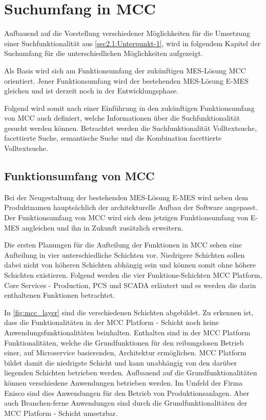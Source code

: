 \chapter{Suchumfang in MCC\label{chap3:Drittes-Kapitel}}

Aufbauend auf die Vorstellung verschiedener Möglichkeiten für die Umsetzung einer Suchfunktionalität aus \autoref{sec2.1:Unterpunkt-1}, wird in folgendem Kapitel der Suchumfang für die unterschiedlichen Möglichkeiten aufgezeigt.

Als Basis wird sich am Funktionsumfang der zukünftigen MES-Lösung \glqq MCC\grqq{} orientiert. Jener Funktionsumfang wird der bestehenden MES-Lösung \glqq E-MES\grqq{} gleichen und ist derzeit noch in der Entwicklungsphase.

Folgend wird somit nach einer Einführung in den zukünftigen Funktionsumfang von \glqq MCC\grqq{} auch definiert, welche Informationen über die Suchfunktionalität gesucht werden können. Betrachtet werden die Suchfunktionalität \glqq Volltextsuche\grqq{}, \glqq facettierte Suche\grqq{}, \glqq semantische Suche\grqq{} und die Kombination \glqq facettierte Volltextsuche\grqq{}.

\section{Funktionsumfang von MCC\label{sec3.1:Unterunterpunkt-1}}

Bei der Neugestaltung der bestehenden MES-Lösung \glqq E-MES\grqq{} wird neben dem Produktnamen hauptsächlich der architekturelle Aufbau der Software angepasst. Der Funktionsumfang von \glqq MCC\grqq{} wird sich dem jetzigen Funktionsumfang von \glqq E-MES\grqq{} angleichen und ihn in Zukunft zusätzlich erweitern.

Die ersten Planungen für die Aufteilung der Funktionen in \glqq MCC\grqq{} sehen eine Aufteilung in vier unterschiedliche Schichten vor. Niedrigere Schichten sollen dabei nicht von höheren Schichten abhängig sein und können somit ohne höhere Schichten existieren. Folgend werden die vier Funktions-Schichten \glqq MCC Platform\grqq{}, \glqq Core Services - Production\grqq{}, \glqq PCS\grqq{} und \glqq SCADA\grqq{} erläutert und es werden die darin enthaltenen Funktionen betrachtet.

In \autoref{fig:mcc_layer} sind die verschiedenen Schichten abgebildet. Zu erkennen ist, dass die Funktionalitäten in der \glqq MCC Platform\grqq{} - Schicht noch keine Anwendungsfunktionalitäten beinhalten. Enthalten sind in der \glqq MCC Platform\grqq{} Funktionalitäten, welche die Grundfunktionen für den reibungslosen Betrieb einer, auf Microservice basierenden, Architektur ermöglichen. \glqq MCC Platform\grqq{} bildet damit die niedrigste Schicht und kann unabhängig von den darüber liegenden Schichten betrieben werden. Aufbauend auf die Grundfunktionalitäten können verschiedene Anwendungen betrieben werden. Im Umfeld der Firma Enisco sind dies Anwendungen für den Betrieb von Produktionsanlagen. Aber auch Branchen-ferne Anwendungen sind durch die Grundfunktionalitäten der \glqq MCC Platform\grqq{} - Schicht umsetzbar.

